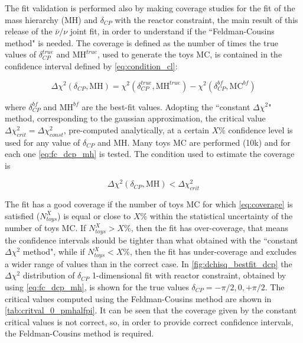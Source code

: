 The fit validation is performed also by making coverage studies for the fit of 
the mass hierarchy (MH) and $\delta_{CP}$ with the reactor constraint, 
the main result of this release of the $\bar{\nu}/\nu$ joint fit,
in order to understand if the ``Feldman-Cousins method" is needed.
The coverage is defined as the number of times the true values of $\delta_{CP}^{true}$ and $\text{MH}^{true}$, used to generate the toys MC,
is contained in the confidence interval defined by \cref{eq:condition_cl}:

\begin{equation}
\Delta \chi^2 (\delta_{CP},\text{MH}) = \chi^2 (\delta_{CP}^{true},\text{MH}^{true}) - \chi^2 (\delta_{CP}^{bf},\text{MC}^{bf})
\label{eq:fc_dcp_mh}
\end{equation}

where $\delta_{CP}^{bf}$ and $\text{MH}^{bf}$ are the best-fit values.
Adopting the ``constant $\Delta \chi^2$" method, 
corresponding to the gaussian approximation,
the critical value $\Delta \chi^2_{crit} = \Delta \chi^2_{const}$, pre-computed analytically,
at a certain $X$\% confidence level is used for any value of $\delta_{CP}$ and MH.
Many toys MC are performed (10k) and for each one \cref{eq:fc_dcp_mh} is tested.
The condition used to estimate the coverage is

\begin{equation}
\Delta \chi^2 (\delta_{CP},\text{MH}) < \Delta \chi^2_{crit}
\label{eq:coverage}
\end{equation}

The fit has a good coverage if the number of toys MC
for which \cref{eq:coverage} is satisfied ($N_{toys}^{X}$)
is equal or close to $X$\% within the statistical uncertainty of the number of toys MC.
If $N_{toys}^{X} > X\%$, then the fit has over-coverage,
that means the confidence intervals should be tighter than what obtained with 
the ``constant $\Delta \chi^2$ method",
while if $N_{toys}^{X} < X\%$, then the fit has under-coverage 
and excludes a wider range of values than in the correct case.
In \cref{fig:dchisq_bestfit_dcp} the $\Delta \chi^2$ distribution
of $\delta_{CP}$ 1-dimensional fit with reactor constraint,
obtained by using \cref{eq:fc_dcp_mh},
is shown for the true values $\delta_{CP} = -\pi/2, 0, +\pi/2$.
The critical values computed using the Feldman-Cousins method are shown in 
\cref{tab:critval_0_pmhalfpi}.
It can be seen that the coverage given by the constant critical values is not correct,
so, in order to provide correct confidence intervals, the Feldman-Cousins method is required. 


